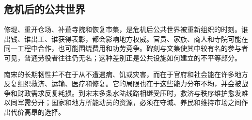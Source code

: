 \subsection{危机后的公共世界}

修堤、重开仓场、补葺寺院和恢复市集，是危机后公共世界被重新组织的时刻。谁出钱、谁出工、谁获得表彰，都会影响地方权威。官员、家族、商人和寺院可能在同一工程中合作，也可能围绕费用和功劳竞争。碑刻与文集使其中较有名的参与者可见，普通劳役者往往仍无名；这种差别正是公共设施如何建立的不平等部分。

南宋的长期韧性并不在于从不遭遇病、饥或灾害，而在于官府和社会能在许多地方反复组织救济、运输、医疗和修复。它的局限也在于这些能力分布不均，并会被战争和财政需求反复耗损。到宋末多条水陆线路相继受压时，救济与秩序维护愈发难以同军需分开；国家和地方所能动员的资源，必须在守城、养民和维持市场之间作出代价高昂的选择。
